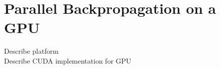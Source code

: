 \section{Parallel Backpropagation on a GPU}
\label{GPUBackProp}

Describe platform \\
Describe CUDA implementation for GPU